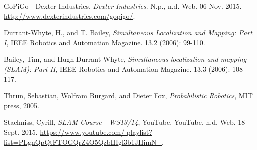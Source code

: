 \documentclass[conference]{IEEEtran}
\begin{document}

%
%
%
\begin{thebibliography}{1}

GoPiGo - Dexter Industries. \emph{Dexter Industries}. N.p., n.d. Web. 06 Nov. 2015. \url{http://www.dexterindustries.com/gopigo/}.

Durrant-Whyte, H., and T. Bailey, \emph{Simultaneous Localization and Mapping: Part I}, IEEE Robotics and Automation Magazine. 13.2 (2006): 99-110.

Bailey, Tim, and Hugh Durrant-Whyte, \emph{Simultaneous localization and mapping (SLAM): Part II}, IEEE Robotics and Automation Magazine. 13.3 (2006): 108-117.

Thrun, Sebastian, Wolfram Burgard, and Dieter Fox, \emph{Probabilistic Robotics}, MIT press, 2005.

Stachniss, Cyrill, \emph{SLAM Course - WS13/14}, YouTube. YouTube, n.d. Web. 18 Sept. 2015. \url{https://www.youtube.com/ playlist?list=PLgnQpQtFTOGQrZ4O5QzbIHgl3b1JHimN_}.

\end{thebibliography}




\end{document}
